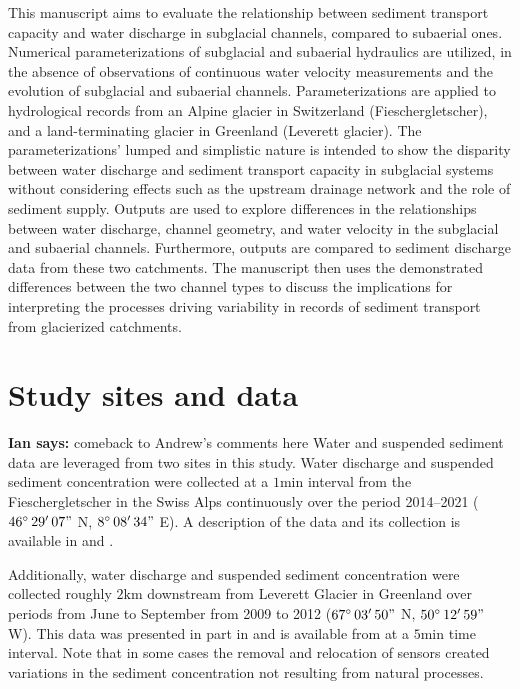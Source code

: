 \documentclass[11pt]{article}
\newcommand{\TODO}[1]{\textbf{TODO: \color{red}#1}}
\newcommand{\ian}[1]{{\textbf{\color{blue}Ian says:} \color{blue} #1} }
\newcommand{\unit}[1]{$\mathrm{#1}$}
\begin{document}
This manuscript aims to evaluate the relationship between sediment transport capacity and water discharge in subglacial channels, compared to subaerial ones.
Numerical parameterizations of subglacial and subaerial hydraulics are utilized, in the absence of observations of continuous water velocity measurements and the evolution of subglacial and subaerial channels.
Parameterizations are applied to hydrological records from an Alpine glacier in Switzerland (Fieschergletscher), and  a land-terminating glacier in Greenland (Leverett glacier).
The parameterizations' lumped and simplistic nature is intended to show the disparity between water discharge and sediment transport capacity in subglacial systems  without considering effects such as the upstream drainage network and the role of sediment supply.
Outputs are used to explore differences in the relationships between  water discharge, channel geometry, and water velocity in the subglacial and subaerial channels. 
Furthermore, outputs are compared to sediment discharge data from these two catchments.
The manuscript then uses the demonstrated differences between the two channel types to discuss the implications for interpreting the processes driving variability in records of sediment transport from glacierized catchments.

\section{Study sites and data}
\label{sect:ss_data}


\ian{comeback to Andrew's comments here}
Water and suspended sediment data are leveraged from two sites in this study.
Water discharge and suspended sediment concentration were collected at a $1$\unit{min} interval from the Fieschergletscher in the Swiss Alps  continuously over the period 2014--2021 ($46^\circ\,29'\,07"$ N, $8^\circ\,08'\,34"$ E).
A description of the data and its collection is available in \citet{felix2022} and \citet{felix2021}.

Additionally, water discharge and suspended sediment concentration were collected roughly $2$\unit{km} downstream from Leverett Glacier in Greenland over  periods from June to September from 2009 to 2012 ($67^\circ\,03'\,50"$ N, $50^\circ\,12'\,59"$ W).
This data was presented in part in \citet{cowton2012} and is available from \citet{tedstone2017} at a $5$\unit{min} time interval.
Note that in some cases the removal and relocation of sensors created variations in the sediment concentration not resulting from natural processes.
\end{document}
